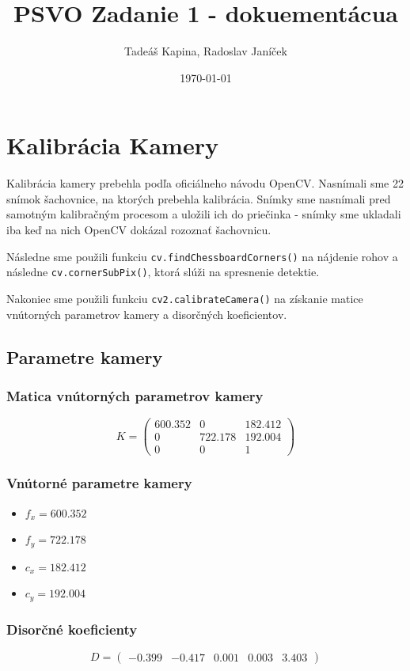 \documentclass{article}
\title{PSVO Zadanie 1 - dokuementácua}
\author{Tadeáš Kapina, Radoslav Janíček}
\date{\today}
\begin{document}
\maketitle

\section{Kalibrácia Kamery}

Kalibrácia kamery prebehla podľa oficiálneho návodu OpenCV. Nasnímali sme 22 snímok šachovnice, na ktorých prebehla kalibrácia. 
Snímky sme nasnímali pred samotným kalibračným procesom a uložili ich do priečinka - snímky sme ukladali iba keď na nich OpenCV dokázal rozoznať šachovnicu. 

Následne sme použili funkciu \texttt{cv.findChessboardCorners()} na nájdenie rohov a následne \texttt{cv.cornerSubPix()}, ktorá slúži na spresnenie detektie.

Nakoniec sme použili funkciu \texttt{cv2.calibrateCamera()} na získanie matice vnútorných parametrov kamery a disorčných koeficientov.

\subsection{Parametre kamery}

\subsubsection*{Matica vnútorných parametrov kamery}
\[
K = \begin{pmatrix}
600.352 & 0 & 182.412 \\
0 & 722.178 & 192.004 \\
0 & 0 & 1
\end{pmatrix}
\]

\subsubsection*{Vnútorné parametre kamery}
\begin{itemize}
    \item $f_x = 600.352$
    \item $f_y = 722.178$
    \item $c_x = 182.412$
    \item $c_y = 192.004$
\end{itemize}

\subsubsection*{Disorčné koeficienty}
\[
D = \begin{pmatrix}
-0.399 & -0.417 & 0.001 & 0.003 & 3.403
\end{pmatrix}
\]
\end{document}
